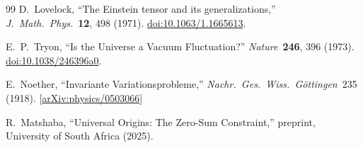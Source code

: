 \documentclass[12pt,a4paper]{article}
\theoremstyle{definition}
\theoremstyle{remark}
\begin{document}
\begin{thebibliography}{99}
D.~Lovelock,
``The Einstein tensor and its generalizations,''
\textit{J.\ Math.\ Phys.}\ \textbf{12}, 498 (1971).
\href{https://doi.org/10.1063/1.1665613}{doi:10.1063/1.1665613}.

E.~P.~Tryon,
``Is the Universe a Vacuum Fluctuation?''
\textit{Nature}\ \textbf{246}, 396 (1973).
\href{https://doi.org/10.1038/246396a0}{doi:10.1038/246396a0}.

E.~Noether,
``Invariante Variationsprobleme,''
\textit{Nachr.\ Ges.\ Wiss.\ G\"ottingen}\ 235 (1918).
[\href{https://arxiv.org/abs/physics/0503066}{arXiv:physics/0503066}]

R.~Matshaba,
``Universal Origins: The Zero-Sum Constraint,''
preprint, University of South Africa (2025).

\end{thebibliography}
\end{document}
